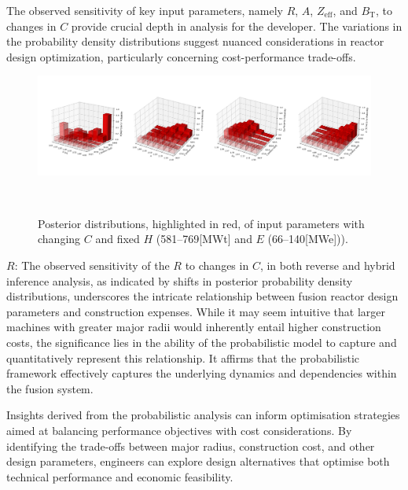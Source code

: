 \documentclass[journal]{IEEEtran}
\begin{document}
The observed sensitivity of key input parameters, namely $R$, $A$, $Z_{\text{eff}}$, and $B_{\text{T}}$, to changes in $C$ provide crucial depth in analysis for the developer. The variations in the probability density distributions suggest nuanced considerations in reactor design optimization, particularly concerning cost-performance trade-offs. 

\begin{figure}[t]
    \centering
    \includegraphics[width=\textwidth]{figures/TE_results/march_data/3D_posteriors.png}
    \caption{\small Posterior distributions, highlighted in red, of input parameters with changing $C$ and fixed $H$ (581--769[MWt] and $E$ (66--140[MWe])).}~\label{fig:posterior_planes3}
\end{figure}

\textbf{$R$}: The observed sensitivity of the $R$ to changes in $C$, in both reverse and hybrid inference analysis, as indicated by shifts in posterior probability density distributions, underscores the intricate relationship between fusion reactor design parameters and construction expenses. While it may seem intuitive that larger machines with greater major radii would inherently entail higher construction costs, the significance lies in the ability of the probabilistic model to capture and quantitatively represent this relationship. It affirms that the probabilistic framework effectively captures the underlying dynamics and dependencies within the fusion system. 

Insights derived from the probabilistic analysis can inform optimisation strategies aimed at balancing performance objectives with cost considerations. By identifying the trade-offs between major radius, construction cost, and other design parameters, engineers can explore design alternatives that optimise both technical performance and economic feasibility.
\end{document}
